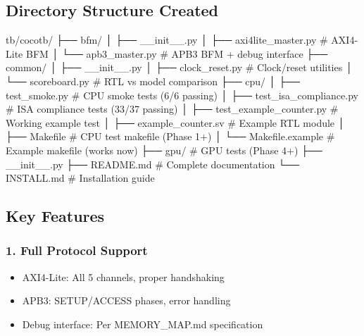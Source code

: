 \subsection{Directory Structure Created}\label{cr:app:archive-cocotb-setup-summary:directory-structure-created}

\begin{record}

\begin{textblock}
tb/cocotb/
├── bfm/
│   ├── __init__.py
│   ├── axi4lite_master.py      # AXI4-Lite BFM
│   └── apb3_master.py          # APB3 BFM + debug interface
├── common/
│   ├── __init__.py
│   ├── clock_reset.py          # Clock/reset utilities
│   └── scoreboard.py           # RTL vs model comparison
├── cpu/
│   ├── test_smoke.py           # CPU smoke tests (6/6 passing)
│   ├── test_isa_compliance.py  # ISA compliance tests (33/37 passing)
│   ├── test_example_counter.py # Working example test
│   ├── example_counter.sv      # Example RTL module
│   ├── Makefile                # CPU test makefile (Phase 1+)
│   └── Makefile.example        # Example makefile (works now)
├── gpu/                        # GPU tests (Phase 4+)
├── __init__.py
├── README.md                   # Complete documentation
└── INSTALL.md                  # Installation guide
\end{textblock}

\end{record}

\subsection{Key Features}\label{cr:app:archive-cocotb-setup-summary:key-features}

\subsubsection{1. Full Protocol Support}\label{cr:app:archive-cocotb-setup-summary:1-full-protocol-support}

\begin{record}

\begin{itemize}
\tightlist
\item
  \ok{} AXI4-Lite: All 5 channels, proper handshaking
\item
  \ok{} APB3: SETUP/\allowbreak{}ACCESS phases, error handling
\item
  \ok{} Debug interface: Per MEMORY\_\allowbreak{}MAP.md specification
\end{itemize}

\end{record}

